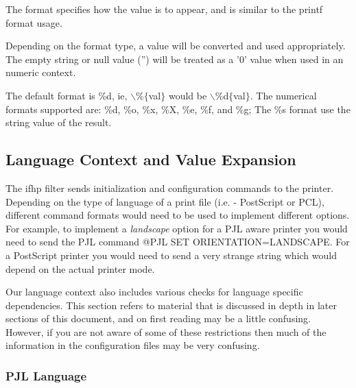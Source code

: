 \documentclass[a4paper]{article}
\begin{document}
\begin{description}
The format specifies how the value is to appear,
and is similar to the printf format usage.

Depending on the format type,
a value will be converted and used appropriately.
The empty string or null value ({\ttfamily ''}) will be treated as a {\ttfamily '0'}
value when used in an numeric context.

The default format is \%d, ie, $\backslash$\%$\{$val$\}$ would be $\backslash$\%d$\{$val$\}$.
The numerical formats supported are: \%d, \%o, \%x, \%X, \%e, \%f, and \%g;
The \%s format use the string value of the result.

\end{description}



\subsection{Language Context and Value Expansion}

The {\ttfamily ifhp} filter sends initialization and configuration commands to the
printer.
Depending on the type of language of a print file (i.e. - PostScript or PCL),
different command formats would need to be used to implement different options.
For example,  to implement a {\itshape landscape\/} option for a PJL aware printer
you would need to send the PJL command {\ttfamily @PJL SET ORIENTATION=LANDSCAPE}.
For a PostScript printer you would need to send a very strange string
which would depend on the actual printer mode.

Our language context also includes various checks for
language specific dependencies.
This section refers to material that is discussed in depth in later
sections of this document,
and on first reading may be a little confusing.
However,
if you are not aware of some of these restrictions then much of the information
in the configuration files may be very confusing.


\subsubsection{PJL Language}
\end{document}
